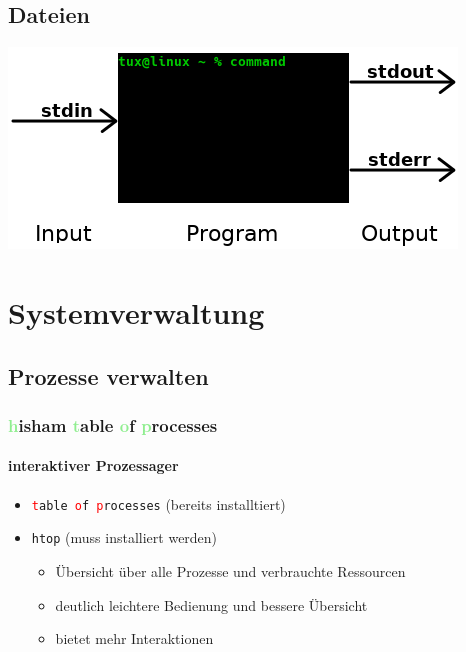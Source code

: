 \documentclass[12pt,utf8]{beamer}
\begin{document}
\subsection{Dateien}
\begin{frame}
	\centering\includegraphics[scale=0.65]{res/IOE}
\end{frame}

\begin{frame}
	\Huge\centering{$|$~~~$>$}
\end{frame}

\begin{frame}
\Huge\centering{\&}
\end{frame}

\section{Systemverwaltung}
\subsection{Prozesse verwalten}
\begin{frame}
\frametitle{\textcolor{lightGreen}{h}isham \textcolor{lightGreen}{t}able \textcolor{lightGreen}{o}f \textcolor{lightGreen}{p}rocesses}
\framesubtitle{interaktiver Prozessager}
\begin{itemize}
	\item \texttt{\textcolor{red}{t}able \textcolor{red}{o}f \textcolor{red}{p}rocesses} (bereits installtiert)
	\item \texttt{htop} (muss installiert werden)
	\begin{itemize}[<+->]
		\item {\scriptsize Übersicht über alle Prozesse und verbrauchte Ressourcen}
		\item {\scriptsize deutlich leichtere Bedienung und bessere Übersicht}
		\item {\scriptsize bietet mehr Interaktionen}
	\end{itemize}
\end{itemize}
\end{frame}
\end{document}
